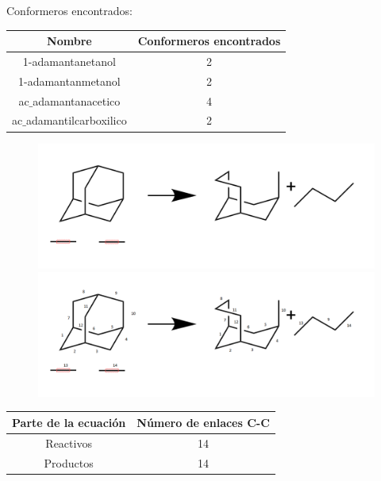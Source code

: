 \documentclass[a4paper,10pt]{article}
\begin{document}
\vspace*{50}
Conformeros encontrados:\\

\begin{tabular}{|c|c|}
\hline
{Nombre} & {Conformeros encontrados} \\ \hline
1-adamantanetanol & 2 \\ \hline
1-adamantanmetanol & 2 \\ \hline
ac$\_$adamantanacetico & 4 \\ \hline
ac$\_$adamantilcarboxilico & 2 \\ \hline

\end{tabular}

\begin{figure}[H]
 \includegraphics[width=15cm]{reaccion.png} \\
 \includegraphics[width=15cm]{reaccion_num_car.png}
\end{figure}

\begin{tabular}{|c|c|}
\hline
{Parte de la ecuación} & {Número de enlaces C-C} \\ \hline
Reactivos & 14 \\ \hline
Productos & 14 \\ \hline

\end{tabular}
\end{document}
